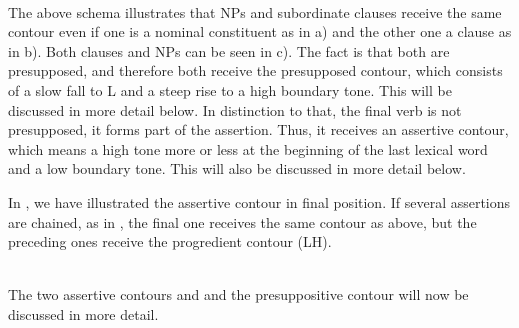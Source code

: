  \\
The above schema illustrates that NPs and subordinate clauses receive the same contour even if one is a nominal constituent as in a) and the other one a clause as in b). Both clauses and NPs can be seen in c).  The fact is that both are presupposed, and therefore both receive the presupposed contour, which consists of a slow fall to L and a steep rise to a high boundary tone. This will be discussed in more detail below. In distinction to that, the final verb is not presupposed, it forms part of the assertion. Thus, it receives an assertive contour, which means a high tone more or less at the beginning of the last lexical word and a low boundary tone. This will also be discussed in more detail below.

In , we have illustrated the assertive contour in final position. If several assertions are chained, as in , the final one receives the same contour as above, but the preceding ones receive the progredient contour (LH). 

 \\
The two assertive contours and and the presuppositive contour will now be discussed in more detail. 




